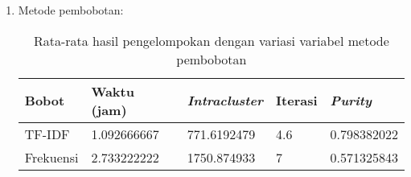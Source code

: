 \begin{enumerate}
		Dapat disimpulkan dari grafik pada Gambar \ref{fig:graph:pop-intra}, kenaikan populasi juga mempengaruhi kenaikan \textit{intracluster similarity}. Sama dengan variabel waktu, perbedaan \textit{intracluster similarity} antara populasi berjumlah 100 dan 150 jauh lebih besar dibandingkan perbedaan \textit{intracluster similarity} antara populasi berjumlah 50 dan 100. Hal ini dikarenakan dengan populasi yang lebih banyak maka kemungkinan untuk mendapat solusi yang lebih baik akan semakin besar.
		\begin{figure}[H]
			\centering
			\texttt{[image: grafik-pop-iterasi]}
			\caption{Grafik hubungan banyaknya populasi dengan banyaknya iterasi}
			\label{fig:graph:pop-iteration}
		\end{figure}
		
		Dapat disimpulkan dari grafik pada Gambar \ref{fig:graph:pop-iteration}, kenaikan populasi tidak mempengaruhi banyaknya iterasi yang dilakukan dalam mencapai konvergen. Rata-rata banyaknya iterasi untuk populasi berjumlah 50, 100, dan 150 tidak memiliki perbedaan yang begitu signifikan.
		
		\begin{figure}[H]
			\centering
			\texttt{[image: grafik-pop-purity]}
			\caption{Grafik hubungan banyaknya populasi dengan nilai \textit{purity}}
			\label{fig:graph:pop-purity}
		\end{figure}
		
		Dapat disimpulkan dari grafik pada Gambar \ref{fig:graph:pop-purity}, kenaikan populasi juga tidak mempengaruhi nilai \textit{purity} sama seperti banyaknya iterasi. Berdasarkan nilai \textit{purity}, maka hasil terbaik diperoleh dengan populasi sebanyak 100 individu.
		
		\item Metode pembobotan:
		\begin{table}[H]
			\centering
			\begin{tabular}{|l|l|l|l|l|} \hline
				Bobot & Waktu (jam) & \textit{Intracluster} & Iterasi& \textit{Purity} \\ \hline
				TF-IDF    & 1.092666667 & 771.6192479 & 4.6 & 0.798382022 \\
				Frekuensi & 2.733222222 & 1750.874933 & 7   & 0.571325843 \\ \hline
			\end{tabular}
			\caption{Rata-rata hasil pengelompokan dengan variasi variabel metode pembobotan}
			\label{tbl:exp-weight}
		\end{table}
		

\end{enumerate}
